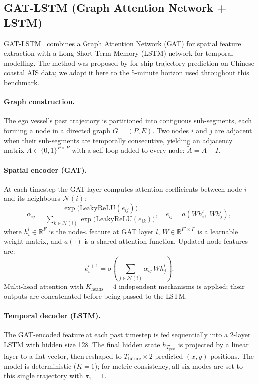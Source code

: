 \documentclass[12pt, a4paper]{article}
\begin{document}
\subsection{GAT-LSTM (Graph Attention Network + LSTM)}
\label{sec:gatlstm}

GAT-LSTM~\citep{zhao2023gatlstm} combines a Graph Attention Network
(GAT) for spatial feature extraction with a Long Short-Term Memory
(LSTM) network for temporal modelling.  The method was proposed by
\citet{zhao2023gatlstm} for ship trajectory prediction on Chinese
coastal AIS data; we adapt it here to the 5-minute horizon used
throughout this benchmark.

\paragraph{Graph construction.}
The ego vessel's past trajectory is partitioned into contiguous
sub-segments, each forming a node in a directed graph $G = (P, E)$.
Two nodes $i$ and $j$ are adjacent when their sub-segments are
temporally consecutive, yielding an adjacency matrix
$A \in \{0,1\}^{P \times P}$ with a self-loop added to every node:
$\tilde{A} = A + I$.

\paragraph{Spatial encoder (GAT).}
At each timestep the GAT layer computes attention coefficients between
node $i$ and its neighbours $\mathcal{N}(i)$:
\begin{equation}
  \alpha_{ij} =
    \frac{\exp\!\bigl(\text{LeakyReLU}(e_{ij})\bigr)}
         {\sum_{k \in \mathcal{N}(i)} \exp\!\bigl(\text{LeakyReLU}(e_{ik})\bigr)},
  \quad
  e_{ij} = a\!\left(W h_i^l,\; W h_j^l\right),
  \label{eq:gat_attn}
\end{equation}
where $h_i^l \in \mathbb{R}^F$ is the node-$i$ feature at GAT layer $l$,
$W \in \mathbb{R}^{F' \times F}$ is a learnable weight matrix, and
$a(\cdot)$ is a shared attention function.  Updated node features are:
\begin{equation}
  h_i^{l+1} = \sigma\!\left(\sum_{j \in \mathcal{N}(i)} \alpha_{ij}\, W h_j^l\right).
  \label{eq:gat_update}
\end{equation}
Multi-head attention with $K_{\text{heads}} = 4$ independent mechanisms
is applied; their outputs are concatenated before being passed to the
LSTM.

\paragraph{Temporal decoder (LSTM).}
The GAT-encoded feature at each past timestep is fed sequentially into
a 2-layer LSTM with hidden size 128.  The final hidden state
$h_{T_{\text{past}}}$ is projected by a linear layer to a flat vector,
then reshaped to $T_{\text{future}} \times 2$ predicted $(x, y)$
positions.  The model is deterministic ($K = 1$); for metric consistency,
all six modes are set to this single trajectory with $\pi_1 = 1$.
\end{document}
